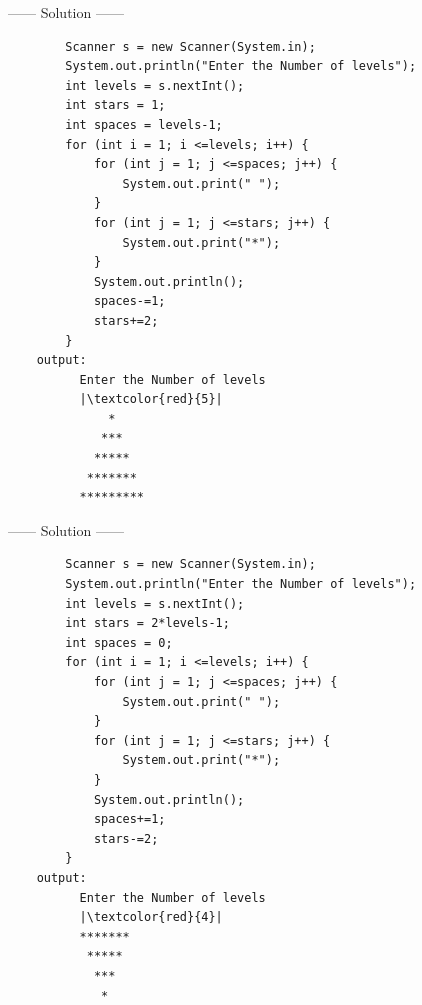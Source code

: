 \begin{example}
  \begin{center}
    ------ \textcolor{Solution}{Solution} ------ 
  \end{center} 

  \begin{verbatim}
        Scanner s = new Scanner(System.in);
        System.out.println("Enter the Number of levels");
        int levels = s.nextInt();
        int stars = 1;
        int spaces = levels-1;
        for (int i = 1; i <=levels; i++) {
            for (int j = 1; j <=spaces; j++) {
                System.out.print(" ");
            }
            for (int j = 1; j <=stars; j++) {
                System.out.print("*");
            }
            System.out.println();
            spaces-=1;
            stars+=2;
        }
    output:
          Enter the Number of levels
          |\textcolor{red}{5}|
              *
             ***
            *****
           *******
          *********
  \end{verbatim}
\end{example}
\begin{minipage}[h]{1\textwidth}
\begin{example}
  \begin{center}
    ------ \textcolor{Solution}{Solution} ------ 
  \end{center} 

  \begin{verbatim}
        Scanner s = new Scanner(System.in);
        System.out.println("Enter the Number of levels");
        int levels = s.nextInt();
        int stars = 2*levels-1;
        int spaces = 0;
        for (int i = 1; i <=levels; i++) {
            for (int j = 1; j <=spaces; j++) {
                System.out.print(" ");
            }
            for (int j = 1; j <=stars; j++) {
                System.out.print("*");
            }
            System.out.println();
            spaces+=1;
            stars-=2;
        }
    output:
          Enter the Number of levels
          |\textcolor{red}{4}|
          *******
           *****
            ***
             *
  \end{verbatim}
\end{example}
\end{minipage}

